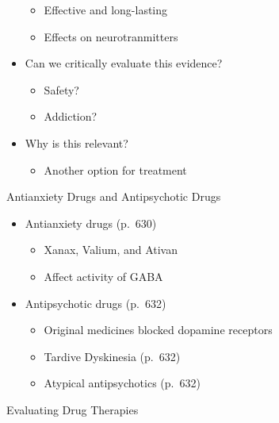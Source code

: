 \documentclass[
]{book}
\providecommand{\tightlist}{%
  \setlength{\itemsep}{0pt}\setlength{\parskip}{0pt}}
\begin{document}
\begin{reflect}
\begin{itemize}
  \begin{itemize}
  \tightlist
  \item
    Effective and long-lasting\\
  \item
    Effects on neurotranmitters\\
  \end{itemize}
\item
  Can we critically evaluate this evidence?

  \begin{itemize}
  \tightlist
  \item
    Safety?\\
  \item
    Addiction?\\
  \end{itemize}
\item
  Why is this relevant?

  \begin{itemize}
  \tightlist
  \item
    Another option for treatment
  \end{itemize}
\end{itemize}

Antianxiety Drugs and Antipsychotic Drugs

\begin{itemize}
\tightlist
\item
  Antianxiety drugs (p.~630)

  \begin{itemize}
  \tightlist
  \item
    Xanax, Valium, and Ativan\\
  \item
    Affect activity of GABA\\
  \end{itemize}
\item
  Antipsychotic drugs (p.~632)

  \begin{itemize}
  \tightlist
  \item
    Original medicines blocked dopamine receptors\\
  \item
    Tardive Dyskinesia (p.~632)\\
  \item
    Atypical antipsychotics (p.~632)
  \end{itemize}
\end{itemize}

Evaluating Drug Therapies


\end{reflect}
\end{document}
